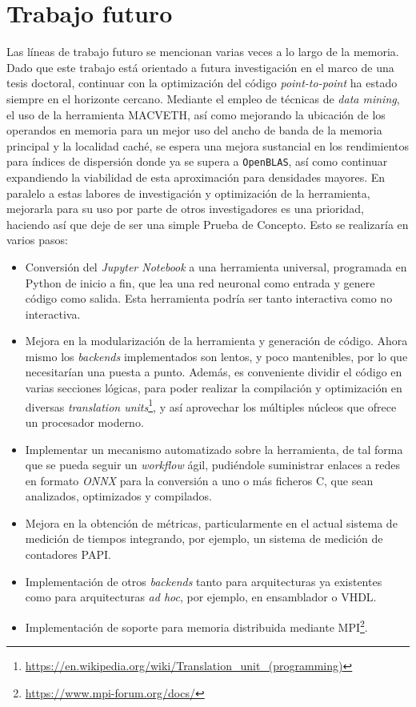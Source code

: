 \section{Trabajo futuro}
Las líneas de trabajo futuro se mencionan varias veces a lo largo de la memoria. Dado que este trabajo está orientado a futura investigación en el marco de una tesis doctoral, continuar con la optimización del código \textit{point-to-point} ha estado siempre en el horizonte cercano. Mediante el empleo de técnicas de \textit{data mining}, el uso de la herramienta MACVETH, así como mejorando la ubicación de los operandos en memoria para un mejor uso del ancho de banda de la memoria principal y la localidad caché, se espera una mejora sustancial en los rendimientos para índices de dispersión donde ya se supera a \texttt{OpenBLAS}, así como continuar expandiendo la viabilidad de esta aproximación para densidades mayores. En paralelo a estas labores de investigación y optimización de la herramienta, mejorarla para su uso por parte de otros investigadores es una prioridad, haciendo así que deje de ser una simple Prueba de Concepto. Esto se realizaría en varios pasos: 
\begin{itemize}
    \item Conversión del \textit{Jupyter Notebook} a una herramienta universal, programada en Python de inicio a fin, que lea una red neuronal como entrada y genere código como salida. Esta herramienta podría ser tanto interactiva como no interactiva.
    \item Mejora en la modularización de la herramienta y generación de código. Ahora mismo los \textit{backends} implementados son lentos, y poco mantenibles, por lo que necesitarían una puesta a punto. Además, es conveniente dividir el código en varias secciones lógicas, para poder realizar la compilación y optimización en diversas \textit{translation units}\footnote{\url{https://en.wikipedia.org/wiki/Translation_unit_(programming)}}, y así aprovechar los múltiples núcleos que ofrece un procesador moderno.
    \item Implementar un mecanismo automatizado sobre la herramienta, de tal forma que se pueda seguir un \textit{workflow} ágil, pudiéndole suministrar enlaces a redes en formato \textit{ONNX} para la conversión a uno o más ficheros C, que sean analizados, optimizados y compilados.
    \item Mejora en la obtención de métricas, particularmente en el actual sistema de medición de tiempos integrando, por ejemplo, un sistema de medición de contadores PAPI.
    \item Implementación de otros \textit{backends} tanto para arquitecturas ya existentes como para arquitecturas \textit{ad hoc}, por ejemplo, en ensamblador o VHDL.
    \item Implementación de soporte para memoria distribuida mediante MPI\footnote{\url{https://www.mpi-forum.org/docs/}}.
\end{itemize}
